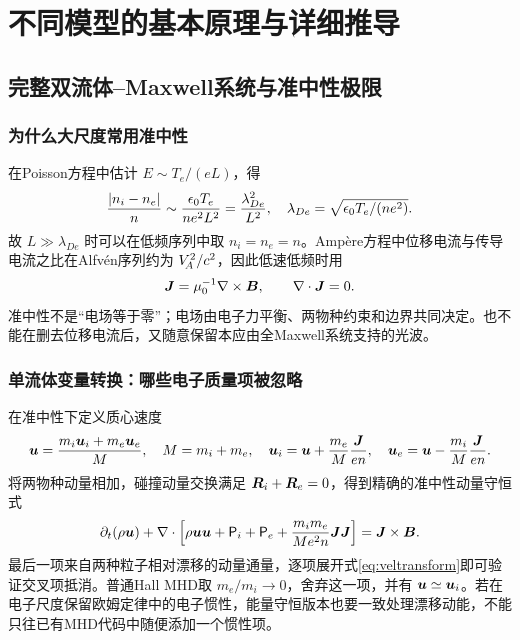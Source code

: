 \chapter{不同模型的基本原理与详细推导}\label{ch:models}



\section{完整双流体--Maxwell系统与准中性极限}\label{sec:twofluid-system}


\subsection{为什么大尺度常用准中性}
在Poisson方程中估计 $E\sim T_e/(eL)$，得
\begin{equation}{|n_i-n_e|\over n}\sim{\epsilon_0T_e\over ne^2L^2}
={\lambda_{De}^2\over L^2},\quad\lambda_{De}=\sqrt{\epsilon_0T_e/(ne^2)}.
\end{equation}
故 $L\gg\lambda_{De}$ 时可以在低频序列中取 $n_i=n_e=n$。Ampère方程中位移电流与传导电流之比在Alfvén序列约为 $V_{\!A}^2/c^2$，因此低速低频时用
\begin{equation}\bm{J}=\mu_0^{-1}\nabla\times\bm{B},\qquad\nabla\cdot\bm{J}=0.\label{eq:ampere}\end{equation}
准中性不是“电场等于零”；电场由电子力平衡、两物种约束和边界共同决定。也不能在删去位移电流后，又随意保留本应由全Maxwell系统支持的光波。

\subsection{单流体变量转换：哪些电子质量项被忽略}
在准中性下定义质心速度
\begin{equation}\bm{u}={m_i\bm{u}_i+m_e\bm{u}_e\over M},\quad M=m_i+m_e,\quad
\bm{u}_i=\bm{u}+{m_e\over M}{\bm{J}\over en},\quad
\bm{u}_e=\bm{u}-{m_i\over M}{\bm{J}\over en}.\label{eq:veltransform}\end{equation}
将两物种动量相加，碰撞动量交换满足 $\bm{R}_i+\bm{R}_e=0$，得到精确的准中性动量守恒式
\begin{equation}
\partial_t(\rho\bm{u})+\nabla\cdot\left[\rho\bm{u}\bm{u}+\mathsf P_i+\mathsf P_e+
{m_im_e\over M e^2n}\bm{J}\bm{J}\right]=\bm{J}\times\bm{B}.\label{eq:singlemom}
\end{equation}
最后一项来自两种粒子相对漂移的动量通量，逐项展开式\eqref{eq:veltransform}即可验证交叉项抵消。普通Hall MHD取 $m_e/m_i\to0$，舍弃这一项，并有 $\bm{u}\simeq\bm{u}_i$。若在电子尺度保留欧姆定律中的电子惯性，能量守恒版本也要一致处理漂移动能，不能只往已有MHD代码中随便添加一个惯性项。

